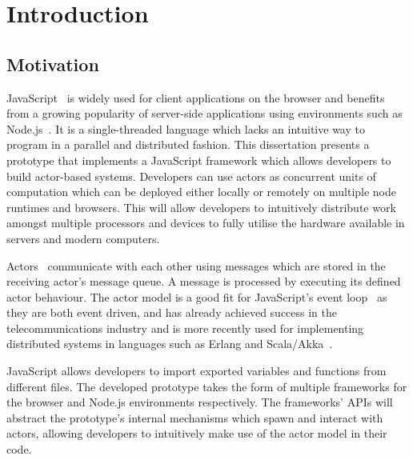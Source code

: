 \documentclass[oneside]{um-fict}
\begin{document}
\mainmatter
\chapter{Introduction}\label{chap:intro}
\section{Motivation}
JavaScript~\cite{ecmascript} is widely used for client applications on the browser and benefits from a growing popularity of server-side applications using environments such as Node.js~\cite{nodejs}. It is a single-threaded language which lacks an intuitive way to program in a parallel and distributed fashion. This dissertation presents a prototype that implements a JavaScript framework which allows developers to build actor-based systems. Developers can use actors as concurrent units of computation which can be deployed either locally or remotely on multiple node runtimes and browsers. This will allow developers to intuitively distribute work amongst multiple processors and devices to fully utilise the hardware available in servers and modern computers.

Actors~\cite{hewitt1973session}\cite{43years} communicate with each other using messages which are stored in the receiving actor's message queue. A message is processed by executing its defined actor behaviour. The actor model is a good fit for JavaScript's event loop~\cite{eventloopbrowser}\cite{eventloopnode} as they are both event driven, and has already achieved success in the telecommunications industry and is more recently used for implementing distributed systems in languages such as Erlang and Scala/Akka~\cite{haller2012integration}.

JavaScript allows developers to import exported variables and functions from different files. The developed prototype takes the form of multiple frameworks for the browser and Node.js environments respectively. The frameworks' APIs will abstract the prototype's internal mechanisms which spawn and interact with actors, allowing developers to intuitively make use of the actor model in their code.
\end{document}
